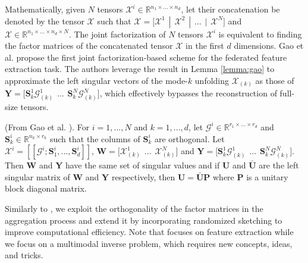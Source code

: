 Mathematically, given $N$ tensors $\boldsymbol{\mathcal{X}}^i \in \mathbb{R}^{n_1\times...\times n_d}$, let their concatenation be denoted by the tensor $\boldsymbol{\mathcal{X}}$ such that $\boldsymbol{\mathcal{X}} = \big[\boldsymbol{\mathcal{X}}^1\hspace{5pt}|\hspace{5pt} \boldsymbol{\mathcal{X}}^2 \hspace{5pt}|\hspace{5pt} ... \hspace{5pt}|\hspace{5pt} \boldsymbol{\mathcal{X}}^N\big]$ and $\boldsymbol{\mathcal{X}} \in \mathbb{R}^{n_1 \times ... \times n_d \times N}$. The joint factorization of $N$ tensors $\boldsymbol{\mathcal{X}}^i$ is equivalent to finding the factor matrices of the concatenated tensor $\boldsymbol{\mathcal{X}}$ in the first $d$ dimensions. Gao et al. \cite{gao2021federated} propose the first joint factorization-based scheme for the federated feature extraction task. The authors leverage the result in Lemma \ref{lemma:gao} to approximate the left singular vectors of the mode-$k$ unfolding $\boldsymbol{\mathcal{X}}_{(k)}$ as those of $\mathbf{Y} = \big[\mathbf{S}_k^1\boldsymbol{\mathcal{G}}^1_{(k)} \hspace{5pt} ... \hspace{5pt} \mathbf{S}_k^N\boldsymbol{\mathcal{G}}^N_{(k)}\big]$, which effectively bypasses the reconstruction of full-size tensors. 
\begin{lemma}\label{lemma:gao}
(From Gao et al. \cite{gao2021federated}). For $i=1,...,N$ and $k=1,...,d$, let $\boldsymbol{\mathcal{G}}^i \in \mathbb{R}^{r_1\times...\times r_d}$ and $\mathbf{S}^i_k \in \mathbb{R}^{n_k\times r_k}$ such that the columns of $\mathbf{S}^i_k$ are orthogonal. Let $\boldsymbol{\mathcal{X}}^i = [\![\boldsymbol{\mathcal{G}}^i; \mathbf{S}_1^i, ..., \mathbf{S}_d^i]\!]$, $\mathbf{W} = \big[\boldsymbol{\mathcal{X}}^1_{(k)} \hspace{5pt} ... \hspace{5pt} \boldsymbol{\mathcal{X}}^N_{(k)} \big]$ and $\mathbf{Y} = \big[\mathbf{S}_k^1\boldsymbol{\mathcal{G}}^1_{(k)} \hspace{5pt} ... \hspace{5pt} \mathbf{S}_k^N\boldsymbol{\mathcal{G}}^N_{(k)}\big]$. Then $\mathbf{W}$ and $\mathbf{Y}$ have the same set of singular values and if $\mathbf{U}$ and $\mathbf{\bar{U}}$ are the left singular matrix of $\mathbf{W}$ and $\mathbf{Y}$ respectively, then $\mathbf{U} = \bar{\mathbf{U}}\mathbf{P}$ where $\mathbf{P}$ is a unitary block diagonal matrix. 
\end{lemma}
Similarly to \cite{gao2021federated}, we exploit the orthogonality of the factor matrices in the aggregation process and extend it by incorporating randomized sketching to improve computational efficiency. Note that \cite{gao2021federated} focuses on feature extraction while we focus on a multimodal inverse problem, which requires new concepts, ideas, and tricks.

